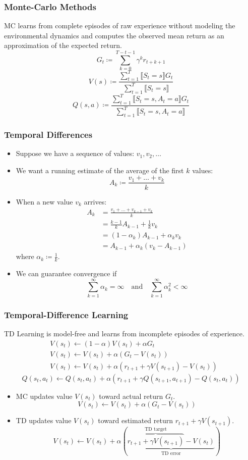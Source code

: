 \documentclass[UTF8,11pt,colorlinks,compress,openany]{beamer}%
\begin{document}
\begin{frame}\frametitle{Monte-Carlo Methods}
\setlength\abovedisplayskip{0pt}
\setlength\belowdisplayskip{0pt}
MC learns from complete episodes of raw experience without modeling the environmental dynamics and computes the observed mean return as an approximation of the expected return.
\[G_t\coloneqq \sum\limits_{k=0}^{T-t-1}\gamma^k r_{t+k+1}\]
\[V(s)\coloneqq \frac{\sum\limits_{t=1}^T\llbracket S_t=s\rrbracket G_t}{\sum\limits_{t=1}^T\llbracket S_t=s\rrbracket}\]
\[Q(s,a)\coloneqq \frac{\sum\limits_{t=1}^T\llbracket S_t=s,A_t=a\rrbracket G_t}{\sum\limits_{t=1}^T\llbracket S_t=s,A_t=a\rrbracket}\]
\end{frame}

\begin{frame}\frametitle{Temporal Differences}
\begin{itemize}
	\item Suppose we have a sequence of values: $v_1,v_2,\dots$
	\item We want a running estimate of the average of the first $k$ values:
	\[A_k\coloneqq\frac{v_1+\dots+v_k}{k}\]
	\item When a new value $v_k$ arrives:
	\begin{align*}
		A_k&=\frac{v_1+\dots+v_{k-1}+v_k}{k}\\
		&=\frac{k-1}{k}A_{k-1}+\frac{1}{k}v_k\\
		&=(1-\alpha_k)A_{k-1}+\alpha_kv_k\\
		&=A_{k-1}+\alpha_k(v_k-A_{k-1})
	\end{align*}
	where $\alpha_k\coloneqq\frac{1}{k}$.
	\item We can guarantee convergence if
	\[\sum\limits_{k=1}^\infty\alpha_k=\infty\quad\mbox{and}\quad\sum\limits_{k=1}^\infty\alpha_k^2<\infty\]
\end{itemize}
\end{frame}

\begin{frame}\frametitle{Temporal-Difference Learning}
TD Learning is model-free and learns from incomplete episodes of experience.
\begin{align*}
	&V(s_t)\gets(1-\alpha)V(s_t)+\alpha G_t\\
	&V(s_t)\gets V(s_t)+\alpha(G_t-V(s_t))\\
	&V(s_t)\gets V(s_t)+\alpha(r_{t+1}+\gamma V(s_{t+1})-V(s_t))
\end{align*}
\[Q(s_t,a_t)\gets Q(s_t,a_t)+\alpha(r_{t+1}+\gamma Q(s_{t+1},a_{t+1})-Q(s_t,a_t))\]
\begin{itemize}
	\item MC updates value $V(s_t)$ toward actual return $G_t$.
	\[V(s_t)\gets V(s_t)+\alpha(G_t-V(s_t))\]
	\item TD updates value $V(s_t)$ toward estimated return $r_{t+1}+\gamma V(s_{t+1})$.
	\[V(s_t)\gets V(s_t)+\alpha(\underbrace{\overbrace{r_{t+1}+\gamma V(s_{t+1})}^{\text{TD target}}-V(s_t)}_{\text{TD error}})\]
\end{itemize}
\end{frame}
\end{document}

